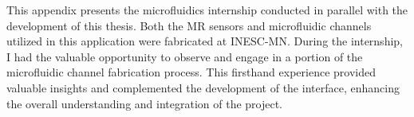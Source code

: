 
\label{appendix:b}

This appendix presents the microfluidics internship conducted in parallel with the development of this thesis. Both the \ac{MR} sensors and microfluidic channels utilized in this application were fabricated at \ac{INESC-MN}. During the internship, I had the valuable opportunity to observe and engage in a portion of the microfluidic channel fabrication process. This firsthand experience provided valuable insights and complemented the development of the interface, enhancing the overall understanding and integration of the project.

